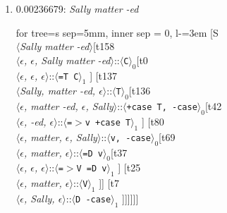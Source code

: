 \documentclass[11pt]{article}
\begin{document}
\begin{enumerate}
	\item  0.00236679: \textit{Sally matter -ed} \\[0.5em]
	\begin{forest}
	for tree={s sep=5mm, inner sep = 0, l-=3em}
	[S\\$\langle$\textit{Sally matter -ed}$\rangle$[t158\\$\langle$\textit{$\epsilon${,} $\epsilon${,} Sally matter -ed}$\rangle$::$\langle$\texttt{C}$\rangle_0$[t0\\$\langle$\textit{$\epsilon${,} $\epsilon${,} $\epsilon$}$\rangle$::$\langle$\texttt{{=}T C}$\rangle_1$ ] [t137\\$\langle$\textit{Sally{,} matter -ed{,} $\epsilon$}$\rangle$::$\langle$\texttt{T}$\rangle_0$[t136\\$\langle$\textit{$\epsilon${,} matter -ed{,} $\epsilon${,} Sally}$\rangle$::$\langle$\texttt{+case T{,} -case}$\rangle_0$[t42\\$\langle$\textit{$\epsilon${,} -ed{,} $\epsilon$}$\rangle$::$\langle$\texttt{{=}$>$v +case T}$\rangle_1$ ] [t80\\$\langle$\textit{$\epsilon${,} matter{,} $\epsilon${,} Sally}$\rangle$::$\langle$\texttt{v{,} -case}$\rangle_0$[t69\\$\langle$\textit{$\epsilon${,} matter{,} $\epsilon$}$\rangle$::$\langle$\texttt{{=}D v}$\rangle_0$[t37\\$\langle$\textit{$\epsilon${,} $\epsilon${,} $\epsilon$}$\rangle$::$\langle$\texttt{{=}$>$V {=}D v}$\rangle_1$ ] [t25\\$\langle$\textit{$\epsilon${,} matter{,} $\epsilon$}$\rangle$::$\langle$\texttt{V}$\rangle_1$ ]] [t7\\$\langle$\textit{$\epsilon${,} Sally{,} $\epsilon$}$\rangle$::$\langle$\texttt{D -case}$\rangle_1$ ]]]]]]
	\end{forest}
	\newpage


\end{enumerate}
\end{document}
